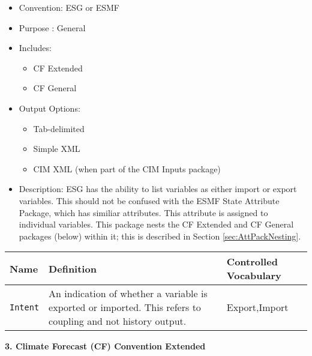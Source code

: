 \begin{itemize}
    \item Convention: ESG or ESMF
    \item Purpose : General
    \item Includes: 
    \begin{itemize}
        \item CF Extended
        \item CF General
    \end{itemize}
    \item Output Options: 
    \begin{itemize}
        \item Tab-delimited
        \item Simple XML
        \item CIM XML (when part of the CIM Inputs package)
    \end{itemize}
    \item Description: ESG has the ability to list variables as either import or export variables. This should not be confused with the ESMF State Attribute Package, which has similiar attributes. This attribute is assigned to individual variables.   This package nests the CF Extended and CF General packages (below) within it; this is described in Section \ref{sec:AttPackNesting}.
\end{itemize}

\begin{tabular}{|p{5cm}|p{5cm}|p{4cm}|}
     \hline\hline
     {\bf Name } & {\bf Definition} & {\bf Controlled Vocabulary} \\
     \hline\hline
     {\tt Intent} & An indication of whether a variable is exported or imported. This refers to coupling and not history output. & Export,Import\\
     \hline\hline
\end{tabular}

\vspace{.20in}

{\bf 3. Climate Forecast (CF) Convention Extended}

